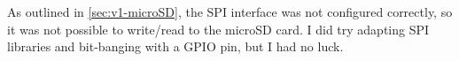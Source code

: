 As outlined in \autoref{sec:v1-microSD}, the SPI interface was not configured correctly, so it was not possible to write/read to the microSD card. I did try adapting SPI libraries and bit-banging with a GPIO pin, but I had no luck.